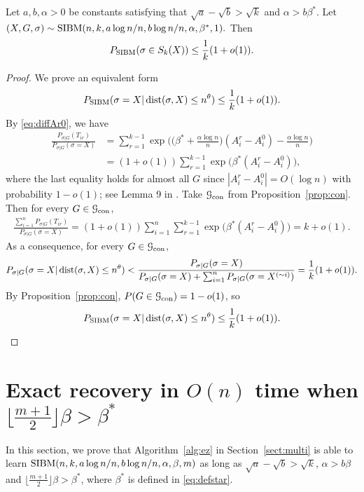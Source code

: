 \documentclass{article}
\begin{document}
\begin{proposition}  \label{prop:zj}
	Let $a,b,\alpha> 0$ be constants satisfying that $\sqrt{a}-\sqrt{b} > \sqrt{k}$ and $\alpha>b\beta^\ast$. Let 
	$
	(X,G,\sigma) \sim \operatorname{SIBM}(n,k, a\log n/n, b\log n/n,\alpha,\beta^\ast, 1) .
	$
	Then 
	$$
	P_{\operatorname{SIBM}}(\sigma \in S_k(X)) \le \frac{1}{k}(1+o(1)) .
	$$
\end{proposition}
\begin{proof}
	We prove an equivalent form
	$$
	P_{\operatorname{SIBM}}(\sigma = X | \operatorname{dist}(\sigma, X) \le n^{\theta}) \le \frac{1}{k}(1+o(1)) .
	$$
	By \eqref{eq:diffAr0}, we have
	\begin{align*}
	\frac{P_{\sigma|G}(T_{ir})}
	{P_{\sigma|G}(\sigma=X)}
	& = \sum_{r=1}^{k-1}\exp\Big(\big(\beta^\ast+\frac{\alpha\log n}{n} \big) (A^r_i-A^0_i)
	-\frac{\alpha\log n}{n} \Big) \\
	& = (1+o(1))\sum_{r=1}^{k-1} \exp\big(\beta^\ast (A^r_i-A^0_i) \big)  ,
	\end{align*}
	where the last equality holds for almost all $G$ since $|A^r_i-A^0_i|=O(\log n)$ with probability $1-o(1)$; see Lemma 9 in \cite{ye2020exact}.
	Take $\mathcal{G}_{\operatorname{con}}$ from Proposition~\ref{prop:con}. Then for every $G\in\mathcal{G}_{\operatorname{con}}$,
	\begin{align*}
	\frac{\sum_{i=1}^n P_{\sigma|G}(T_{ir} )}
	{P_{\sigma|G}(\sigma=X)}  = (1+o(1)) \sum_{i=1}^n \sum_{r=1}^{k-1}\exp\big(\beta^\ast (A^r_i-A^0_i) \big)  =k+o(1) .
	\end{align*}
	As a consequence, for every $G\in\mathcal{G}_{\operatorname{con}}$,
	\begin{align*}
	P_{\sigma|G} (\sigma= X | \operatorname{dist}(\sigma, X) \le n^{\theta}) <
	\frac {P_{\sigma|G}(\sigma=X)}
	{P_{\sigma|G}(\sigma=X)+\sum_{i=1}^n P_{\sigma|G}(\sigma=X^{(\sim i)} )}
	=\frac{1}{k} (1+o(1)) .
	\end{align*}
	By Proposition~\ref{prop:con}, $P(G\in\mathcal{G}_{\operatorname{con}})=1-o(1)$, so
	$$
	P_{\operatorname{SIBM}}(\sigma= X | \operatorname{dist}(\sigma, X) \le n^{\theta} ) \le \frac{1}{k}(1+o(1)) .
	$$
\end{proof}
\section{Exact recovery in $O(n)$ time when $\lfloor \frac{m+1}{2} \rfloor \beta>\beta^\ast$}
\label{sect:direct}
In this section, we prove that Algorithm~\ref{alg:ez} in Section~\ref{sect:multi} is able to learn $\SIBM(n,k,a\log n/n, \linebreak[4] b\log n/n,\alpha,\beta, m)$ as long as $\sqrt{a}-\sqrt{b} > \sqrt{k}$,  $\alpha>b\beta$ and $\lfloor \frac{m+1}{2} \rfloor \beta>\beta^\ast$, where $\beta^\ast$ is defined in \eqref{eq:defstar}.
\end{document}
